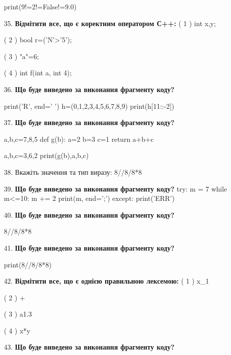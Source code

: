 \documentclass[11pt]{article}
\begin{document}
print(9!=2!=False!=9.0)
\par\vspace{5mm}
35. %
\textbf{Відмітити все, що є коректним оператором С++:}
( 1 ) int x,y;

( 2 ) bool r=('N'>'5');

( 3 ) "a"=6;

( 4 ) int f(int a, int 4);
\par\vspace{5mm}
36. \textbf{Що буде виведено за виконання фрагменту коду?}

print('R', end=' ')
h=(0,1,2,3,4,5,6,7,8,9)
print(h[11::-2])

\par\vspace{5mm}
37. \textbf{Що буде виведено за виконання фрагменту коду?}

a,b,c=7,8,5
def g(b):
    a=2
    b=3
    c=1
    return a+b+c

a,b,c=3,6,2
print(g(b),a,b,c)
\par\vspace{5mm}
38. 
Вкажіть значення та тип виразу:
8//8/8*8
\par\vspace{5mm}
39. \textbf{Що буде виведено за виконання фрагменту коду?}
try:
    m = 7
    while m<=10:
        m += 2
    print(m, end=';')
except:
    print('ERR')
\par\vspace{5mm}
40. \textbf{Що буде виведено за виконання фрагменту коду?}

8//8/8*8
\par\vspace{5mm}
41. \textbf{Що буде виведено за виконання фрагменту коду?}

print(8//8/8*8)
\par\vspace{5mm}
42. %
\textbf{Відмітити все, що є однією правильною лексемою:}
( 1 ) x_1

( 2 ) +

( 3 ) a1.3

( 4 ) x*y
\par\vspace{5mm}
43. \textbf{Що буде виведено за виконання фрагменту коду?}
\end{document}
